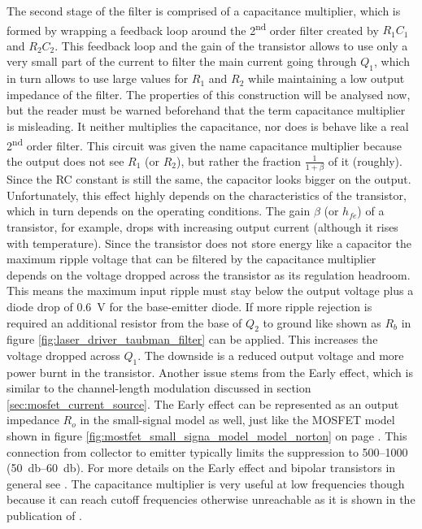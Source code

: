 The second stage of the filter is comprised of a capacitance multiplier, which is formed by wrapping a feedback loop around the 2\textsuperscript{nd} order filter created by $R_1 C_1$ and $R_2 C_2$. This feedback loop and the gain of the transistor allows to use only a very small part of the current to filter the main current going through $Q_1$, which in turn allows to use large values for $R_1$ and $R_2$ while maintaining a low output impedance of the filter. The properties of this construction will be analysed now, but the reader must be warned beforehand that the term capacitance multiplier is misleading. It neither multiplies the capacitance, nor does is behave like a real 2\textsuperscript{nd} order filter. This circuit was given the name capacitance multiplier because the output does not see $R_1$ (or $R_2$), but rather the fraction $\frac{1}{1+\beta}$ of it (roughly). Since the RC constant is still the same, the capacitor looks bigger on the output. Unfortunately, this effect highly depends on the characteristics of the transistor, which in turn depends on the operating conditions. The gain $\beta$ (or $h_{fe}$) of a transistor, for example, drops with increasing output current (although it rises with temperature). Since the transistor does not store energy like a capacitor the maximum ripple voltage that can be filtered by the capacitance multiplier depends on the voltage dropped across the transistor as its regulation headroom. This means the maximum input ripple must stay below the output voltage plus a diode drop of \qty{0.6}{\V} for the base-emitter diode. If more ripple rejection is required an additional resistor from the base of $Q_2$ to ground like shown as $R_b$ in figure \ref{fig:laser_driver_taubman_filter} can be applied. This increases the voltage dropped across $Q_1$. The downside is a reduced output voltage and more power burnt in the transistor. Another issue stems from the Early effect, which is similar to the channel-length modulation discussed in section \ref{sec:mosfet_current_source}. The Early effect can be represented as an output impedance $R_o$ in the small-signal model as well, just like the MOSFET model shown in figure \ref{fig:mostfet_small_signa_model_model_norton} on page \pageref{fig:mostfet_small_signa_model_model_norton}. This connection from collector to emitter typically limits the suppression to \numrange{500}{1000} (\qtyrange[range-phrase={~to~}]{50}{60}{\decibel}). For more details on the Early effect and bipolar transistors in general see \cite{transistor_bible,fet_equations}. The capacitance multiplier is very useful at low frequencies though because it can reach cutoff frequencies otherwise unreachable as it is shown in the publication of \citeauthor{laser_driver_qcl_taubman} \cite{laser_driver_qcl_taubman}.

